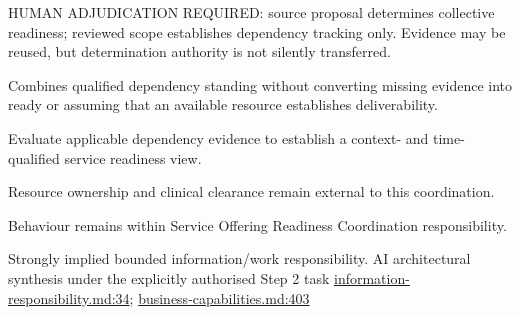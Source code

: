 HUMAN ADJUDICATION REQUIRED: source proposal determines collective readiness; reviewed scope establishes dependency tracking only. Evidence may be reused, but determination authority is not silently transferred.



Combines qualified dependency standing without converting missing evidence into ready or assuming that an available resource establishes deliverability.



Evaluate applicable dependency evidence to establish a context- and time-qualified service readiness view.



Resource ownership and clinical clearance remain external to this coordination.



Behaviour remains within Service Offering Readiness Coordination responsibility.


Strongly implied bounded information/work responsibility. AI architectural synthesis under the explicitly authorised Step 2 task \hyperref[evidence:be61392fefb4bb10]{information-responsibility.md:34}; \hyperref[evidence:a4c0900c47c945d9]{business-capabilities.md:403}
